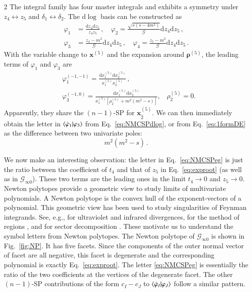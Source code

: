 \documentclass[fleqn]{2023SCGE}
\newcommand{\nn}{\nonumber}
\newcommand{\nd}{\mathrm{d}}
\newcommand{\mG}{\mathcal{G}}
\begin{document}
\begin{multicols}{2}
The integral family has four master integrals and exhibits a symmetry under $z_4\leftrightarrow z_5$ and $\delta_1\leftrightarrow \delta_2$. The $\nd \log$ basis can be constructed as
\begin{align}
\varphi_{1}&=\frac{\nd z_4 \nd z_5}{z_4 z_5} \,,\quad \varphi_{2}=\frac{\sqrt{s(s-4m^2)}}{\mG}\nd z_4 \nd z_5 \,,\nn\\
\varphi_{3}&=\frac{ z_4-m^2 }{\mG}\nd z_4 \nd z_5 \,, \quad \varphi_{4}=\frac{ z_5-m^2}{\mG} \nd z_4 \nd z_5 \,.
\end{align}
With the variable change to $\bm{x}^{(5)}$ and the expansion around $\bm{\rho}^{(5)}$, the leading terms of $\varphi_1$ and $\varphi_3$ are
\begin{align}
    &\varphi_1^{(-1,-1)} = \frac{\nd x_1^{(5)} \nd x_2^{(5)}}{x_1^{(5)} x_2^{(5)}} \, ,\nn\\
    &\varphi_3^{(-1,0)} = \frac{\nd x_1^{(5)} \nd x_2^{(5)}}{x_1^{(5)} \left[\rho^{(5)}_2 +  m^2(m^2-s) \right]}, ~~~~ \rho^{(5)}_2=0.
\end{align}
Apparently, they share the $(n-1)$-SP for $\bm{x}^{(5)}_{\hat{2}}$. We can then immediately obtain the letter in $\braket{\dot{\varphi}_1|\varphi_3}$ from Eq.~\eqref{eq:NMCSPdlog}, or from Eq.~\eqref{eq:1formDE} as the difference between two univariate poles:
\begin{equation}
    m^2(m^2-s) \, .
    \label{eq:NMCSPeg}
\end{equation}




We now make an interesting observation: the letter in Eq.~\eqref{eq:NMCSPeg} is just the ratio between the coefficient of $t_4$ and that of $z_5$ in Eq.~\eqref{eq:exproot} (as well as in $\mG_{\infty 0}$). {  These two terms are the leading ones in the limit $t_4 \to 0$ and $z_5 \to 0$. Newton polytopes provide a geometric view to study limits of multivariate polynomials. A Newton polytope is the convex hull of the exponent-vectors of a polynomial. This geometric view has been used to study singularities of Feynman integrands. See, e.g., \cite{Arkani-Hamed:2022cqe} for ultraviolet and infrared divergences, \cite{Pak:2010pt} for the method of regions \cite{Beneke:1997zp}, and \cite{Kaneko:2009qx} for sector decomposition \cite{Binoth:2000ps, Binoth:2003ak, Binoth:2004jv, Heinrich:2008si, Bogner:2007cr, Smirnov:2021rhf, Borowka:2017idc}.}
These motivate us to understand the symbol letters from Newton polytopes. The Newton polytope of $\mG_{\infty 0}$ is shown in Fig.~\ref{fig:NP}. It has five facets. Since the components of the outer normal vector of facet  are all negative, this facet is degenerate and the corresponding polynomial is exactly Eq.~\eqref{eq:exproot}. The letter \eqref{eq:NMCSPeg} is essentially the ratio of the two coefficients at the vertices of the degenerate facet. The other $(n-1)$-SP contributions of the form $c_I-c_J$ to $\braket{\dot{\varphi}_I|\varphi_J}$ follow a similar pattern.


\end{multicols}
\end{document}
